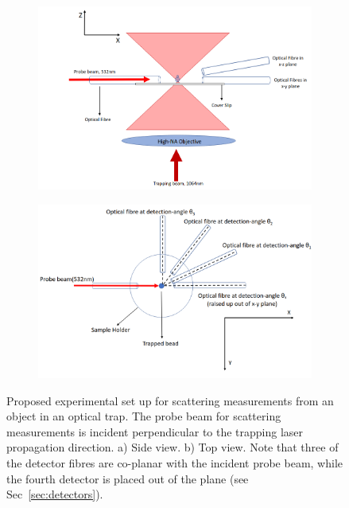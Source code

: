 \documentclass[final,  3p]{elsarticle}
\begin{document}
\begin{figure} [b]
\centering
\begin{subfigure}{0.45\textwidth}
	\subcaption{}
	\includegraphics[width=\textwidth, height=0.25\textheight]{./Images/fig1a.png}
\end{subfigure}
\begin{subfigure}{0.45\textwidth}
	\subcaption{}
	\includegraphics[width=\textwidth, height=0.25\textheight]{./Images/fig1b.png}
\end{subfigure}
\caption{\label{fig:setup}
  Proposed experimental set up for scattering measurements from an object in an optical trap. The probe beam for scattering measurements is incident perpendicular to the trapping laser propagation direction. a) Side view. b) Top view. Note that three of the detector fibres are co-planar with the incident probe beam, while the fourth detector is placed out of the plane (see Sec~\ref{sec:detectors}).
%
}
\end{figure}
\end{document}
